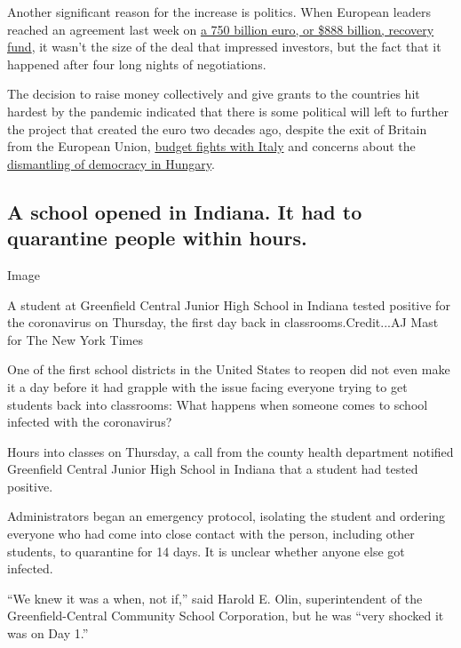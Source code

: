 Another significant reason for the increase is politics. When European
leaders reached an agreement last week on
\href{https://www.nytimes.com/2020/07/20/world/europe/eu-stimulus-coronavirus.html}{a
750 billion euro, or \$888 billion, recovery fund}, it wasn't the size
of the deal that impressed investors, but the fact that it happened
after four long nights of negotiations.

The decision to raise money collectively and give grants to the
countries hit hardest by the pandemic indicated that there is some
political will left to further the project that created the euro two
decades ago, despite the exit of Britain from the European Union,
\href{https://www.ft.com/content/92ec7bc4-9d8f-11e9-9c06-a4640c9feebb}{budget
fights with Italy} and concerns about the
\href{https://www.nytimes.com/2020/06/16/world/europe/hungary-coronavirus-orban.html}{dismantling
of democracy in Hungary}.

\hypertarget{a-school-opened-in-indiana-it-had-to-quarantine-people-within-hours}{%
\subsection{A school opened in Indiana. It had to quarantine people
within
hours.}\label{a-school-opened-in-indiana-it-had-to-quarantine-people-within-hours}}

Image

A student at Greenfield Central Junior High School in Indiana tested
positive for the coronavirus on Thursday, the first day back in
classrooms.Credit...AJ Mast for The New York Times

One of the first school districts in the United States to reopen did not
even make it a day before it had grapple with the issue facing everyone
trying to get students back into classrooms: What happens when someone
comes to school infected with the coronavirus?

Hours into classes on Thursday, a call from the county health department
notified Greenfield Central Junior High School in Indiana that a student
had tested positive.

Administrators began an emergency protocol, isolating the student and
ordering everyone who had come into close contact with the person,
including other students, to quarantine for 14 days. It is unclear
whether anyone else got infected.

``We knew it was a when, not if,'' said Harold E. Olin, superintendent
of the Greenfield-Central Community School Corporation, but he was
``very shocked it was on Day 1.''

